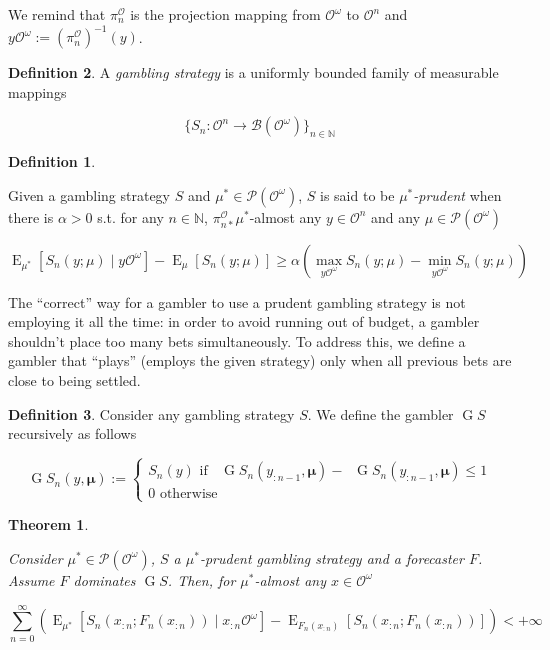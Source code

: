 \documentclass[11pt]{article}
\theoremstyle{definition}
\newtheorem{definition}{Definition}%
\theoremstyle{plain}
\newtheorem{theorem}{Theorem}%
\newcommand{\Nats}{\mathbb{N}}
\newcommand{\Sq}[2]{\{#1\}_{#2 \in \Nats}}
\newcommand{\Sqn}[1]{\Sq{#1}{n}}
\DeclareMathOperator{\E}{E}
\newcommand{\PM}{\mathcal{P}}
\newcommand{\Ob}{\mathcal{O}}
\newcommand{\OO}{\Ob^\omega}
\newcommand{\PO}{\pi^\Ob}
\newcommand{\PMO}{\PM(\OO)}
\newcommand{\Gm}{\mathcal{B}}
\newcommand{\GMO}{\Gm(\OO)}
\DeclareMathOperator{\SVM}{\Sigma V_{\min}}
\DeclareMathOperator{\SVX}{\Sigma V_{\max}}
\DeclareMathOperator{\PG}{G}
\newcommand{\BM}{\bm{\mu}}
\begin{document}
We remind that $\PO_n$ is the projection mapping from $\OO$ to $\Ob^n$ and $y\OO:= (\PO_{n})^{-1}(y)$.

\begin{definition}

A \emph{gambling strategy} is a uniformly bounded family of measurable mappings

\[\Sqn{S_n: \Ob^n \rightarrow \GMO}\]

\begin{definition}
\label{def:prudent}

Given a gambling strategy $S$ and $\mu^* \in \PMO$, $S$ is said to be \emph{$\mu^*$-prudent} when there is $\alpha > 0$ s.t. for any $n \in \Nats$, $\PO_{n*} \mu^*$-almost any $y \in \Ob^n$ and any $\mu \in \PMO$

\begin{equation}
\E_{\mu^*}[S_n(y; \mu) \mid y\OO] - \E_\mu[S_n(y; \mu)] \geq \alpha (\max_{y\OO}{S_n(y; \mu)} - \min_{y\OO}{S_n(y; \mu)})
\end{equation}

\end{definition}

\end{definition}

The \enquote{correct} way for a gambler to use a prudent gambling strategy is not employing it all the time: in order to avoid running out of budget, a gambler shouldn’t place too many bets simultaneously. To address this, we define a gambler that \enquote{plays} (employs the given strategy) only when all previous bets are close to being settled.

\begin{definition}

Consider any gambling strategy $S$. We define the gambler $\PG{S}$ recursively as follows

\begin{equation}
\PG{S}_n(y,\BM):=\begin{cases} S_n(y) \text{ if } {\SVX{\PG{S}}_n(y_{:n-1},\BM)}-{\SVM{\PG{S}}_n(y_{:n-1},\BM)} \leq 1 \\ 0 \text{ otherwise} \end{cases}
\end{equation}

\end{definition}

\begin{theorem}
\label{thm:prudent}

Consider $\mu^* \in \PMO$, $S$ a $\mu^*$-prudent gambling strategy and a forecaster $F$. Assume $F$ dominates $\PG{S}$. Then, for $\mu^*$-almost any $x \in \OO$

\begin{equation}
\label{eqn:thm_prudent}
\sum_{n=0}^\infty (\E_{\mu^*}[S_n(x_{:n};F_n(x_{:n})) \mid x_{:n}\OO]-\E_{F_n(x_{:n})}[S_n(x_{:n};F_n(x_{:n}))]) < +\infty
\end{equation}

\end{theorem}
\end{document}
